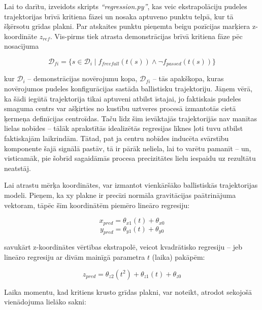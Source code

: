 \documentclass[12pt, a4paper]{article}
\numberwithin{equation}{section} %
\begin{document}
Lai to darītu, izveidots skripts \textit{``regression.py''}, kas veic ekstrapolāciju pudeles trajektorijas brīvā kritiena fāzei un nosaka aptuveno punktu telpā, kur tā šķērsotu grīdas plakni. Par atskaites punktu pieņemta beigu pozīcijas marķiera z-koordināte $z_{ref}$. Vis-pirms tiek atrasta demonstrācijas brīvā kritiena fāze pēc nosacījuma


\begin{equation}
    \mathcal{D}_{fi} = \lbrace s \in \mathcal{D}_i \mid f_{freefall}(t(s)) \land \lnot f_{passed}(t(s)) \rbrace
\end{equation}

kur $\mathcal{D}_i$ -- demonstrācijas novērojumu kopa, $\mathcal{D}_{fi}$ -- tās apakškopa, kuras novērojumos pudeles konfigurācijas sastāda ballistisku trajektoriju. Jāņem vērā, ka šādi iegūtā trajektorija tikai aptuveni atbilst īstajai, jo faktiskais pudeles smaguma centrs var ašķirties no kustību uztveres procesā izmantotās cietā ķermeņa definīcijas centroīdas. Taču līdz šim ievāktajās trajektorijās nav manītas lielas nobīdes -- tālāk aprakstītās idealizētās regresijas līknes ļoti tuvu atbilst faktiskajām laikrindām. Tātad, pat ja centru nobīdes inducēta svārstību komponente šajā signālā pastāv, tā ir pārāk neliela, lai to varētu pamanīt -- un, visticamāk, pie šobrīd sagaidāmās procesa precizitātes lielu iespaidu uz rezultātu neatstāj.

Lai atrastu mērķa koordinātes, var izmantot vienkāršāko ballistiskās trajektorijas modeli. Pieņem, ka xy plakne ir precīzi normāla gravitācijas paātrinājuma vektoram, tāpēc šīm koordinātēm piemēro lineāro regresiju:


\begin{equation}
    x_{pred} = \theta_{x1}(t) + \theta_{x0}
\end{equation}
\begin{equation}
    y_{pred} = \theta_{y1}(t) + \theta_{y0}
\end{equation}

savukārt z-koordinātes vērtības ekstrapolē, veicot kvadrātisko regresiju -- jeb lineāro regresiju ar divām mainīgā parametra $t$ (laika) pakāpēm:

\begin{equation}
    z_{pred} = \theta_{z2}(t^2) + \theta_{z1}(t) + \theta_{z0}
\end{equation}

Laika momentu, kad kritiens krusto grīdas plakni, var noteikt,  atrodot sekojošā vienādojuma lielāko sakni:
\end{document}
